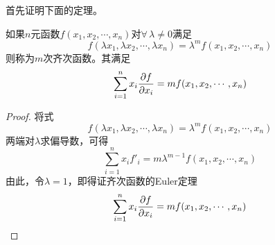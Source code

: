 首先证明下面的定理。
\begin{theorem}[齐次函数的Euler定理]
\label{齐次函数的Euler定理}
如果$n$元函数$f(x_1,x_2,\cdots,x_n)$对$\forall \, \lambda \neq 0$满足
\begin{equation*}
	f(\lambda x_1,\lambda x_2,\cdots,\lambda x_n) = \lambda^m f(x_1,x_2,\cdots,x_n)
\end{equation*}
则称为$m$次{\heiti 齐次函数}。其满足
\begin{equation}
	\sum_{i=1}^n x_i \frac{\partial f}{\partial x_i} = mf(x_1,x_2,\cdots,x_n)
\end{equation}
\end{theorem}
\begin{proof}
将式
\begin{equation*}
	f(\lambda x_1,\lambda x_2,\cdots,\lambda x_n) = \lambda^m f(x_1,x_2,\cdots,x_n)
\end{equation*}
两端对$\lambda$求偏导数，可得
\begin{equation*}
	\sum_{i=1}^n x_i f'_i = m\lambda^{m-1} f(x_1,x_2,\cdots,x_n)
\end{equation*}
由此，令$\lambda = 1$，即得证齐次函数的Euler定理
\begin{equation*}
	\sum_{i=1}^n x_i \frac{\partial f}{\partial x_i} = mf(x_1,x_2,\cdots,x_n) \qedhere
\end{equation*}
\end{proof}

